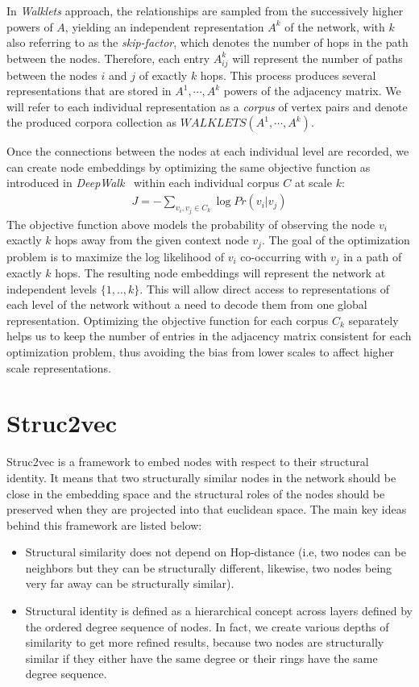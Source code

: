 \documentclass[a4paper,13pt]{article}
\begin{document}
In \textit{Walklets} approach, the relationships are sampled from the successively higher powers of $A$, yielding an independent representation $A^k$ of the network, with $k$ also referring to as the \textit{skip-factor}, which denotes the number of hops in the path between the nodes. Therefore, each entry $A_{ij}^{k}$ will represent the number of paths between the nodes $i$ and $j$ of exactly $k$ hops. This process produces several representations that are stored in $A^1, \cdots, A^k$ powers of the adjacency matrix. We will refer to each individual representation as a \textit{corpus} of vertex pairs and denote the produced corpora collection as $WALKLETS(A^1, \cdots, A^k)$.

Once the connections between the nodes at each individual level are recorded, we can create node embeddings by optimizing the same objective function as introduced in \textit{DeepWalk}~\cite{deepwalk} within each individual corpus $C$ at scale $k$:
\begin{equation*}
\begin{aligned}
J = - \sum_{v_i, v_j \in C_k} \log Pr(v_i|v_j)
\end{aligned}
\end{equation*}
The objective function above models the probability of observing the node $v_i$ exactly $k$ hops away from the given context node $v_j$. The goal of the optimization problem is to maximize the log likelihood of $v_i$ co-occurring with $v_j$ in a path of exactly $k$ hops. The resulting node embeddings will represent the network at independent levels $\{1,..,k\}$. This will allow direct access to representations of each level of the network without a need to decode them from one global representation.  Optimizing the objective function for each corpus $C_k$ separately helps us to keep the number of entries in the adjacency matrix consistent for each optimization problem, thus avoiding the bias from lower scales to affect higher scale representations.

\section{Struc2vec~\cite{struc2vec}}
Struc2vec is a framework to embed nodes with respect to their structural identity. It means that two structurally similar nodes in the network should be close in the embedding space and the structural roles of the nodes should be preserved when they are projected into that euclidean space. The main key ideas behind this framework are listed below:
\begin{itemize}
\item Structural similarity does not depend on Hop-distance (i.e, two nodes can be neighbors but they can be structurally different, likewise, two nodes being very far away can be structurally similar).
\item Structural identity is defined as a hierarchical concept across layers defined by the ordered degree sequence of nodes. In fact, we create various depths of similarity to get more refined results, because two nodes are structurally similar if they either have the same degree or their rings have the same degree sequence.
\end{itemize}
\end{document}
